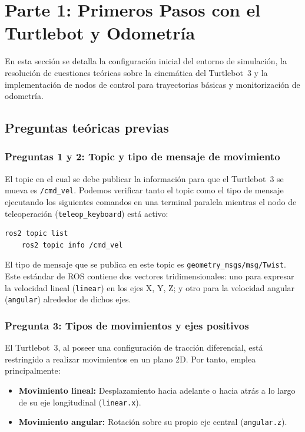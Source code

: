 \chapter{Parte 1: Primeros Pasos con el Turtlebot y Odometría}

En esta sección se detalla la configuración inicial del entorno de simulación, la resolución de cuestiones teóricas sobre la cinemática del Turtlebot~3 y la implementación de nodos de control para trayectorias básicas y monitorización de odometría.

\section{Preguntas teóricas previas}

\subsection*{Preguntas 1 y 2: Topic y tipo de mensaje de movimiento}

El topic en el cual se debe publicar la información para que el Turtlebot~3 se mueva es \texttt{/cmd\_vel}. 
Podemos verificar tanto el topic como el tipo de mensaje ejecutando los siguientes comandos en una terminal paralela mientras el nodo de teleoperación (\texttt{teleop\_keyboard}) está activo:

\begin{lstlisting}[style=bash]
	ros2 topic list
	ros2 topic info /cmd_vel
\end{lstlisting}

El tipo de mensaje que se publica en este topic es \texttt{geometry\_msgs/msg/Twist}. Este estándar de ROS contiene dos vectores tridimensionales: uno para expresar la velocidad lineal (\texttt{linear}) en los ejes X, Y, Z; y otro para la velocidad angular (\texttt{angular}) alrededor de dichos ejes.

\subsection*{Pregunta 3: Tipos de movimientos y ejes positivos}

El Turtlebot~3, al poseer una configuración de tracción diferencial, está restringido a realizar movimientos en un plano 2D. Por tanto, emplea principalmente:
\begin{itemize}
	\item \textbf{Movimiento lineal:} Desplazamiento hacia adelante o hacia atrás a lo largo de su eje longitudinal (\texttt{linear.x}).
	\item \textbf{Movimiento angular:} Rotación sobre su propio eje central (\texttt{angular.z}).
\end{itemize}

